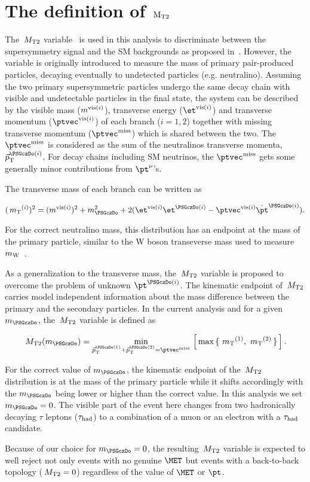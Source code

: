 \section{\texorpdfstring{The definition of $\rm {\ensuremath{\,{M_{\rm T2}}}}$}{The definition of MT2}}
\label{sect:mt2def}
The $\,{M_{\rm T2}}$ variable~\cite{Lester:1999tx,Barr:2003rg} is used in this analysis to discriminate between the supersymmetry signal and the SM backgrounds as proposed in~\cite{Barr:2009wu}. However, the variable is originally introduced to measure the mass of primary pair-produced particles, decaying eventually to undetected particles (e.g. neutralino). Assuming the two primary supersymmetric particles undergo the same decay chain with visible and undetectable particles in the final state, the system can be described by the visible mass ($m^{{\rm vis}(i)}$), transverse energy ($\etvisi$) and transverse momentum ($\vptvisi$) of each branch ($i=1,2$) together with missing transverse momentum ($\ptvecmiss$) which is shared between the two. The $\ptvecmiss$ is considered as the sum of the neutralinos transverse momenta, $\vec{p}_{\rm T}^{\PSGczDo(i)}$. For decay chains including SM neutrinos, the $\ptvecmiss$ gets some generally minor contributions from $\pt^{\nu}$'s.

The transverse mass of each branch can be written as 
\begin{linenomath}
\begin{equation}
\label{eq:mtdef}
(\mt^{(i)})^{2}= (\mvisi)^2+m^2_{\PSGczDo}+2(\etvisi\et^{\PSGczDo(i)}-\vptvisi\dot\pt^{\PSGczDo(i)}).
\end{equation}
\end{linenomath}
For the correct neutralino mass, this distribution has an endpoint at the mass of the primary particle, similar to the W boson transeverse mass used to measure $m_{\rm W}$~\cite{Arnison:1983rp,Banner:1983jy,Affolder:2000bpa,Abazov:2002bu}. 

As a generalization to the transverse mass, the $\,{M_{\rm T2}}$ variable is proposed to overcome the problem of unknown $\pt^{\PSGczDo(i)}$. The kinematic endpoint of $\,{M_{\rm T2}}$ carries model independent information about the mass difference between the primary and the secondary particles. In the current analysis and for a given $m_{\PSGczDo}$, the $\,{M_{\rm T2}}$ variable is defined as
\begin{linenomath}
\begin{equation}
\label{eq:mt2def}
\mttwo(m_{\PSGczDo})= \min_{\vec{p}_{\rm T}^{\PSGczDo(1)}+\vec{p}_{\rm T}^{\PSGczDo(2)}=\ptvecmiss}\,\left[\,\max\,\{ \, \mt^{(1)},\,\mt^{(2)}\,\}\,\right].
\end{equation}
\end{linenomath}
For the correct value of $m_{\PSGczDo}$, the kinematic endpoint of the $\,{M_{\rm T2}}$ distribution is at the mass of the primary particle while it shifts accordingly with the $m_{\PSGczDo}$ being lower or higher than the correct value. In this analysis we set $m_{\PSGczDo}=0$. The visible part of the event here changes from two hadronically decaying $\tau$ leptons ($\tau_{\rm had}$) to a combination of a muon or an electron with a $\tau_{\rm had}$ candidate. 

Because of our choice for $m_{\PSGczDo}=0$, the resulting $\,{M_{\rm T2}}$ variable is expected to well reject not only events with no genuine $\MET$ but events with a back-to-back topology ($\,{M_{\rm T2}}=0$) regardless of the value of $\MET$ or $\pt$. 
